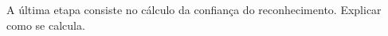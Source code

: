 		A última etapa consiste no cálculo da confiança do reconhecimento. Explicar como se calcula.




























